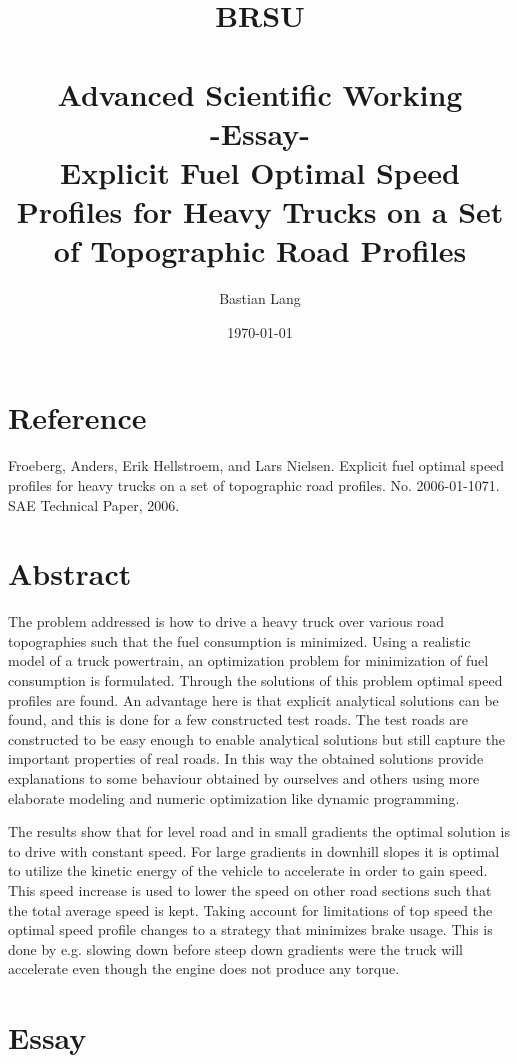 \documentclass[paper=a4, fontsize=11pt]{scrartcl} %
\title{	
\normalfont \normalsize 
\textsc{BRSU} \\ [25pt] %
\horrule{0.5pt} \\[0.4cm] %
\huge Advanced Scientific Working\\-Essay-\\
Explicit Fuel Optimal Speed Profiles for Heavy Trucks on a Set of Topographic Road Profiles %
\horrule{2pt} \\[0.5cm] %
}
\author{Bastian Lang} %
\date{\normalsize\today} %
\numberwithin{equation}{section} %
\numberwithin{figure}{section} %
\numberwithin{table}{section} %
\begin{document}
\maketitle %

\newpage

\section{Reference}
Froeberg, Anders, Erik Hellstroem, and Lars Nielsen. Explicit fuel optimal speed profiles for heavy trucks on a set of topographic road profiles. No. 2006-01-1071. SAE Technical Paper, 2006.

\section{Abstract}


The problem addressed is how to drive a heavy truck over various road topographies such that the fuel consumption is minimized. Using a realistic model of a truck powertrain, an optimization problem for minimization of fuel consumption is formulated. Through the solutions of this problem optimal speed profiles are found. An advantage here is that explicit analytical solutions can be found, and this is done for a few constructed test roads. The test roads are constructed to be easy enough to enable analytical solutions but still capture the important properties of real roads. In this way the obtained solutions provide explanations to some behaviour obtained by ourselves and others using more elaborate modeling and numeric optimization like dynamic programming.\vspace{5mm}

The results show that for level road and in small gradients the optimal solution is to drive with constant speed. For large gradients in downhill slopes it is optimal to utilize the kinetic energy of the vehicle to accelerate in order to gain speed. This speed increase is used to lower the speed on other road sections such that the total average speed is kept. Taking account for limitations of top speed the optimal speed profile changes to a strategy that minimizes brake usage. This is done by e.g. slowing down before steep down gradients were the truck will accelerate even though the engine does not produce any torque.


\newpage
\section{Essay}
\end{document}
